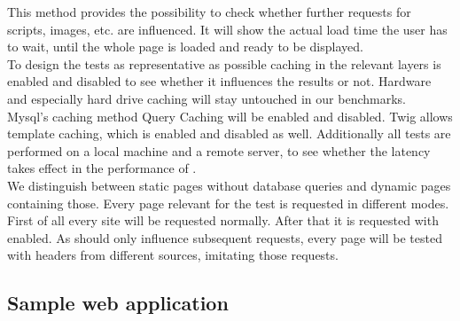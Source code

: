 This method provides the possibility to check whether further requests for scripts, images, etc. are influenced.
It will show the actual load time the user has to wait, until the whole page is loaded and ready to be displayed.
\\
To design the tests as representative as possible caching in the relevant layers is enabled and disabled to see whether it influences the results or not.
Hardware and especially hard drive caching will stay untouched in our benchmarks.
\\
Mysql's caching method Query Caching will be enabled and disabled.
Twig allows template caching, which is enabled and disabled as well.
Additionally all tests are performed on a local machine and a remote server, to see whether the latency takes effect in the performance of \lare{}.
\\
We distinguish between static pages without database queries and dynamic pages containing those.
Every page relevant for the test is requested in different modes.
First of all every site will be requested normally.
After that it is requested with \lare{} enabled.
As \lare{} should only influence subsequent requests, every page will be tested with \http{} headers from different sources, imitating those requests.


\subsection{Sample web application}

